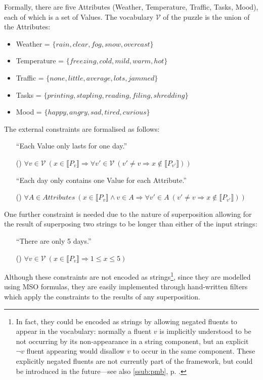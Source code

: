 \documentclass[a4paper,12pt,leqno,twoside]{article}
\newcommand{\V}{\mathcal{V}}
\newcommand{\ipp}{(\refstepcounter{equation}\theequation)}
\begin{document}
Formally, there are five Attributes (Weather, Temperature, Traffic, Tasks, Mood), each of which is a set of Values. The vocabulary $\V$ of the puzzle is the union of the Attributes:
\begin{itemize}
	\item Weather = $\{rain,clear,fog,snow,overcast\}$
	\item Temperature = $\{freezing,cold,mild,warm,hot\}$
	\item Traffic = $\{none,little,average,lots,jammed\}$
	\item Tasks = $\{printing,stapling,reading,filing,shredding\}$
	\item Mood = $\{happy,angry,sad,tired,curious\}$
\end{itemize}
The external constraints are formalised as follows:
\begin{itemize}
	\item[] ``Each Value only lasts for one day.''
	\item[\ipp\label{impl:zebra-constraintsA}] $\forall v \in \V~ (x \in \llbracket P_v \rrbracket \Longrightarrow \forall v' \in \V~ (v' \neq v \Rightarrow x \notin \llbracket P_{v'} \rrbracket))$
	\item[] ``Each day only contains one Value for each Attribute.''
	\item[\ipp\label{impl:zebra-constraintsB}] $\forall A \in Attributes~ (x \in \llbracket P_v \rrbracket \wedge v \in A \Longrightarrow \forall v' \in A~ (v' \neq v \Rightarrow x \notin \llbracket P_{v'} \rrbracket))$
\end{itemize}
One further constraint is needed due to the nature of superposition allowing for the result of superposing two strings to be longer than either of the input strings:
\begin{itemize}
	\item[]``There are only 5 days.''
	\item[\ipp\label{impl:zebra-constraintsC}] $\forall v \in \V~ (x \in \llbracket P_v \rrbracket \Longrightarrow 1 \leq x \leq 5)$
\end{itemize}
Although these constraints are not encoded as strings\footnote{In fact, they could be encoded as strings by allowing negated fluents to appear in the vocabulary: normally a fluent $v$ is implicitly understood to be not occurring by its non-appearance in a string component, but an explicit $\neg{}v$ fluent appearing would disallow $v$ to occur in the same component. These explicitly negated fluents are not currently part of the framework, but could be introduced in the future---see also \cref{ssub:pmb}, p. \pageref{ex:drs-example-d}.}, since they are modelled using MSO formulas, they are easily implemented through hand-written filters which apply the constraints to the results of any superposition.
\end{document}

